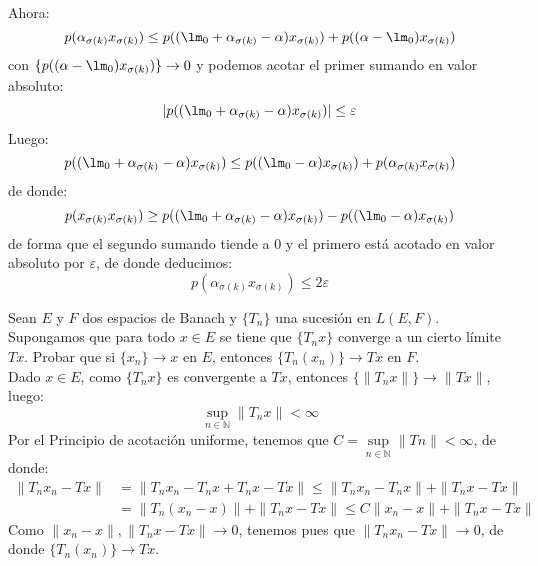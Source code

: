 \begin{ejercicio}
\begin{equation*}
    \end{equation*}
    Ahora:
    \begin{equation*}
        p(\alpha_{\sigma(k)}x_{\sigma(k)})\leq p((\lm_0+\alpha_{\sigma(k)}-\alpha)x_{\sigma(k)}) + p((\alpha-\lm_0)x_{\sigma(k)})
    \end{equation*}
    con $\{ p((\alpha-\lm_0)x_{\sigma(k)})\}\to 0$ y podemos acotar el primer sumando en valor absoluto:
    \begin{equation*}
        |p((\lm_0+\alpha_{\sigma(k)}-\alpha)x_{\sigma(k)}) |\leq \varepsilon
    \end{equation*}
    Luego:
    \begin{equation*}
        p((\lm_0 + \alpha_{\sigma(k)} - \alpha)x_{\sigma(k)}) \leq p((\lm_0-\alpha)x_{\sigma(k)}) + p(\alpha_{\sigma(k)}x_{\sigma(k)})
    \end{equation*}
    de donde:
    \begin{equation*}
        p(x_{\sigma(k)}x_{\sigma(k)}) \geq p((\lm_0 + \alpha_{\sigma(k)}-\alpha)x_{\sigma(k)}) - p((\lm_0-\alpha)x_{\sigma(k)})
    \end{equation*}
    de forma que el segundo sumando tiende a 0 y el primero está acotado en valor absoluto por $\varepsilon$, de donde deducimos:
    \begin{equation*}
        p(\alpha_{\sigma(k)}x_{\sigma(k)}) \leq 2\varepsilon
    \end{equation*}
\end{ejercicio}

\begin{ejercicio}
    Sean $E$ y $F$ dos espacios de Banach y $\{T_n\}$ una sucesión en $L(E,F)$. Supongamos que para todo $x\in E$ se tiene que $\{T_nx\}$ converge a un cierto límite $Tx$. Probar que si $\{x_n\}\to x$ en $E$, entonces $\{T_n(x_n)\}\to Tx$ en $F$.\\

    \noindent
    Dado $x\in E$, como $\{T_nx\}$ es convergente a $Tx$, entonces $\{\|T_nx\|\}\to \|Tx\|$, luego:
    \begin{equation*}
        \sup_{n\in \mathbb{N}}\|T_nx\| < \infty
    \end{equation*}
    Por el Principio de acotación uniforme, tenemos que $C=\sup\limits_{n\in \mathbb{N}}\|Tn\| < \infty$, de donde:
    \begin{align*}
        \|T_nx_n - Tx\| &= \|T_nx_n - T_nx + T_nx - Tx\| \leq \|T_nx_n - T_nx\| + \|T_nx - Tx\| \\
                        &= \|T_n(x_n - x)\| + \|T_nx-Tx\| \leq C\|x_n-x\| + \|T_nx-Tx\|
    \end{align*}
    Como $\|x_n-x\|, \|T_nx-Tx\|\to 0$, tenemos pues que $\|T_nx_n - Tx\| \to 0$, de donde $\{T_n(x_n)\}\to Tx$.
\end{ejercicio}

